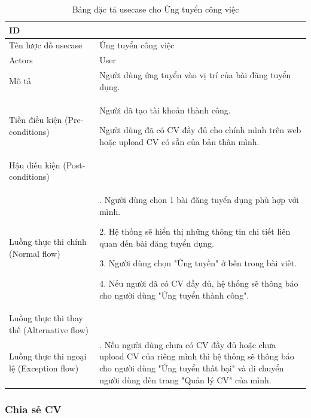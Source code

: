 \begin{table}[H]
    \centering
    \begin{tabular}{|>{\centering\arraybackslash}p{0.3\linewidth}|>{\raggedright\arraybackslash}p{0.7\linewidth}|} \hline 
         ID
& 6\\ \hline 
         
Tên lược đồ usecase
& Ứng tuyển công việc\\ \hline 
         Actors
& User\\ \hline 
         
Mô tả
& Người dùng ứng tuyển vào vị trí của bài đăng tuyển dụng.\\ \hline 
         Tiền điều kiện (Pre-conditions)
& Người đã tạo tài khoản thành công.

Người dùng đã có CV đầy đủ cho chính mình trên web hoặc upload CV có sẵn của bản thân mình.\\ \hline 
         
Hậu điều kiện (Post-conditions)& \\ \hline 
         Luồng thực thi chính (Normal flow)& 1. Người dùng chọn 1 bài đăng tuyển dụng phù hợp với mình.

2. Hệ thống sẽ hiển thị những thông tin chi tiết liên quan đến bài đăng tuyển dụng.

3. Người dùng chọn "Ứng tuyền" ở bên trong bài viết.

4. Nếu người đã có CV đầy đủ, hệ thống sẽ thông báo cho người dùng "Ứng tuyển thành công".\\ \hline 
         
Luồng thực thi thay thế (Alternative flow)
& \\ \hline
 Luồng thực thi ngoại lệ (Exception flow)&4.1. Nếu người dùng chưa có CV đầy đủ hoặc chưa upload CV của riêng mình thì hệ thống sẽ thông báo cho người dùng "Ứng tuyển thất bại" và di chuyển người dùng đến trang "Quản lý CV" của mình.\\\hline
    \end{tabular}
    \caption{Bảng đặc tả usecase cho Ứng tuyển công việc}
    \label{tab:Ứng tuyển công việc}
\end{table}

\subsubsection{Chia sẻ CV}

